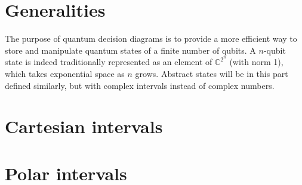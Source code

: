 \section{Generalities}

The purpose of quantum decision diagrams is to provide a more efficient way to store and manipulate quantum states of a finite number of qubits. A $n$-qubit state is indeed traditionally represented as an element of $\mathbb{C}^{2^n}$ (with norm 1), which takes exponential space as $n$ grows. Abstract states will be in this part defined similarly, but with complex intervals instead of complex numbers.



\section{Cartesian intervals}



\section{Polar intervals}
\label{polar}


